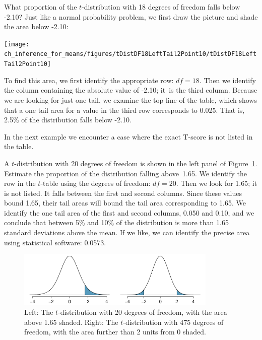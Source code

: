 \begin{examplewrap}
\begin{nexample}{What proportion of the $t$-distribution with
    18 degrees of freedom falls below -2.10?}
  Just like a normal probability problem, we first draw the
  picture and shade the area below -2.10:
  \begin{center}
  \texttt{[image: ch\_inference\_for\_means/figures/tDistDF18LeftTail2Point10/tDistDF18LeftTail2Point10]}
  \end{center}
  To find this area, we first identify the appropriate row:
  $df = 18$.
  Then we identify the column containing the absolute value
  of -2.10;
  it~is the third column.
  Because we are looking for just one tail, we examine the
  top line of the table, which shows that a one tail area
  for a value in the third row corresponds to 0.025.
  That is, 2.5\% of the distribution falls below -2.10.

  In the next example we encounter a case where the exact
  T-score is not listed in the table.
\end{nexample}
\end{examplewrap}

\begin{examplewrap}
\begin{nexample}{A $t$-distribution with 20 degrees of freedom
    is shown in the left panel of
    Figure~\ref{tDistAppendixTwoEx}.
    Estimate the proportion of the distribution falling
    above~1.65.}
  We identify the row in the $t$-table using the degrees
  of freedom: $df=20$.
  Then we look for 1.65; it is not listed.
  It falls between the first and second columns.
  Since these values bound 1.65, their tail areas will
  bound the tail area corresponding to 1.65.
  We identify the one tail area of the first and
  second columns, 0.050 and 0.10, and we conclude that
  between 5\% and 10\% of the distribution is more than
  1.65 standard deviations above the mean.
  If we like, we can identify the precise area using
  statistical software: 0.0573.
\end{nexample}
\end{examplewrap}

\begin{figure}[h]
\centering
\includegraphics[width=0.85\textwidth]{ch_inference_for_means/figures/tDistAppendixTwoEx/tDistAppendixTwoEx}
\caption{Left: The $t$-distribution with 20 degrees of freedom,
    with the area above 1.65 shaded.
    Right: The $t$-distribution with 475 degrees of freedom,
    with the area further than 2 units from 0 shaded.}
\label{tDistAppendixTwoEx}
\end{figure}

